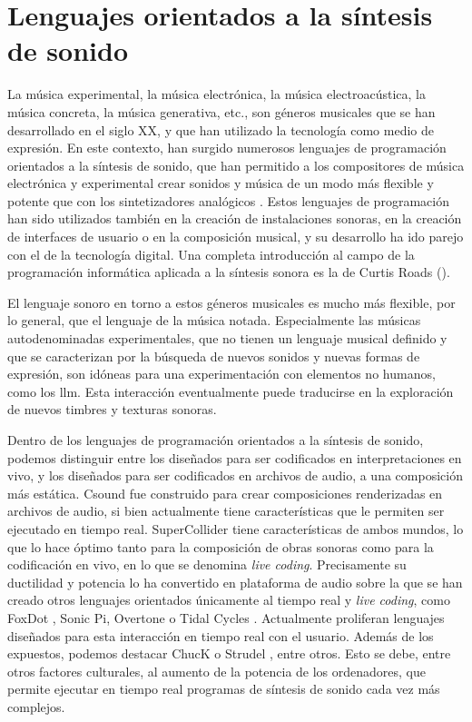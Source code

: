 \section{Lenguajes orientados a la síntesis de sonido}

La música experimental, la música electrónica, la música electroacústica, la música concreta, la música generativa, etc., son géneros musicales que se han desarrollado en el siglo XX, y que han utilizado la tecnología como medio de expresión. En este contexto, han surgido numerosos lenguajes de programación orientados a la síntesis de sonido, que han permitido a los compositores de música electrónica y experimental crear sonidos y música de un modo más flexible y potente que con los sintetizadores analógicos \citep{supperMusicaElectronicaMusica2012}. Estos lenguajes de programación han sido utilizados también en la creación de instalaciones sonoras, en la creación de interfaces de usuario o en la composición musical, y su desarrollo ha ido parejo con el de la tecnología digital. Una completa introducción al campo de la programación informática aplicada a la síntesis sonora es la de Curtis Roads (\citeyear{roadsComputerMusicTutorial1996}).

El lenguaje sonoro en torno a estos géneros musicales es mucho más flexible, por lo general, que el lenguaje de la música notada. Especialmente las músicas autodenominadas experimentales, que no tienen un lenguaje musical definido y que se caracterizan por la búsqueda de nuevos sonidos y nuevas formas de expresión, son idóneas para una experimentación con elementos no humanos, como los \gls{llm}. Esta interacción eventualmente puede traducirse en la exploración de nuevos timbres y texturas sonoras.

Dentro de los lenguajes de programación orientados a la síntesis de sonido, podemos distinguir entre los diseñados para ser codificados en interpretaciones en vivo, y los diseñados para ser codificados en archivos de audio, a una composición más estática. {Csound} \citep{boulangerCsoundBookPerspectives2000} fue construido para crear composiciones renderizadas en archivos de audio, si bien actualmente tiene características que le permiten ser ejecutado en tiempo real. {SuperCollider} \citep{wilsonSuperColliderBook2011a} tiene características de ambos mundos, lo que lo hace óptimo tanto para la composición de obras sonoras como para la codificación en vivo, en lo que se denomina \emph{live coding}. Precisamente su ductilidad y potencia lo ha convertido en plataforma de audio sobre la que se han creado otros lenguajes orientados únicamente al tiempo real y \emph{live coding}, como {FoxDot} \citep{kirkbrideQirkyFoxDot2023}, {Sonic Pi}, {Overtone} \citep{OvertoneCollaborativeProgrammable} o {Tidal Cycles} \citeyear{TidalCycles}. Actualmente proliferan lenguajes diseñados para esta interacción en tiempo real con el usuario. Además de los expuestos, podemos destacar {ChucK} \citep{teamChucKStronglyTimedMusic} o {Strudel} \citep{StrudelREPL}, entre otros. Esto se debe, entre otros factores culturales, al aumento de la potencia de los ordenadores, que permite ejecutar en tiempo real programas de síntesis de sonido cada vez más complejos.

